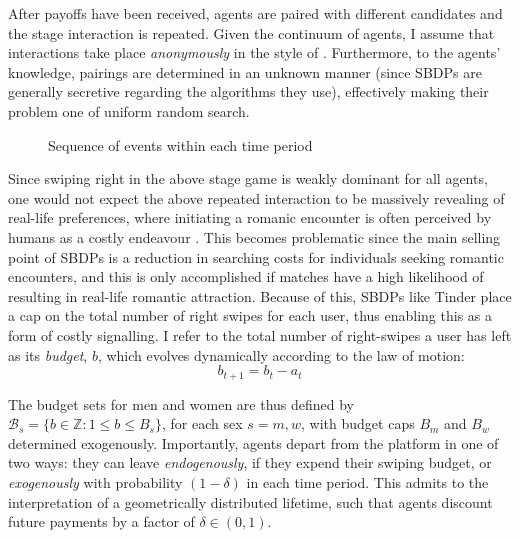 After payoffs have been received, agents are paired with different candidates and the stage interaction is repeated. Given the continuum of agents, I assume that interactions take place \textit{anonymously} in the style of \cite{jovanovic1988anonymous}. Furthermore, to the agents' knowledge, pairings are determined in an unknown manner (since SBDPs are generally secretive regarding the algorithms they use), effectively making their problem one of uniform random search.

\begin{figure}[ht]
    \centering 
    \caption{Sequence of events within each time period}
    \vspace{20pt} 
    \label{fig:timeline}
\end{figure}

Since swiping right in the above stage game is weakly dominant for all agents, one would not expect the above repeated interaction to be massively revealing of real-life preferences, where initiating a romanic encounter is often perceived by humans as a costly endeavour \citep{dawkins2017selfish}. This becomes problematic since the main selling point of SBDPs is a reduction in searching costs for individuals seeking romantic encounters, and this is only accomplished if matches have a high likelihood of resulting in real-life romantic attraction. Because of this, SBDPs like Tinder place a cap on the total number of right swipes for each user, thus enabling this as a form of costly signalling. I refer to the total number of right-swipes a user has left as its \textit{budget}, $b$, which evolves dynamically according to the law of motion: 
\begin{equation*} 
  b_{t+1}= b_{t}- a_{t} 
\end{equation*}

The budget sets for men and women are thus defined by $\mathcal{B}_{s}=\{b \in \mathbb{Z} : 1\leq b \leq B_s\}$, for each sex $s=m,w$, with budget caps $B_m$ and $B_w$ determined exogenously. Importantly, agents depart from the platform in one of two ways: they can leave \textit{endogenously}, if they expend their swiping budget, or \textit{exogenously} with probability $(1-\delta)$ in each time period. This admits to the interpretation of a geometrically distributed lifetime, such that agents discount future payments by a factor of $\delta\in(0,1)$. 

